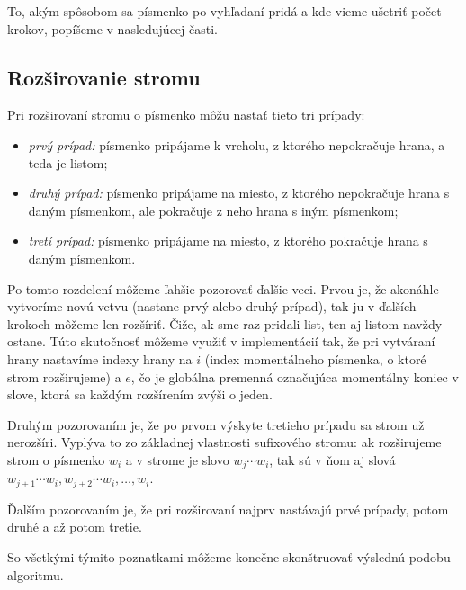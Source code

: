 To, akým spôsobom sa písmenko po vyhľadaní pridá a kde vieme ušetriť počet 
krokov, popíšeme v nasledujúcej časti.

\subsection{Rozširovanie stromu}

Pri rozširovaní stromu o písmenko môžu nastať tieto tri prípady:
\begin{itemize}
\item \emph{prvý prípad:} písmenko pripájame k vrcholu, z ktorého nepokračuje 
hrana, a teda je listom;
\item \emph{druhý prípad:} písmenko pripájame na miesto, z ktorého nepokračuje 
hrana s daným písmenkom, ale pokračuje z neho hrana s iným písmenkom;
\item \emph{tretí prípad:} písmenko pripájame na miesto, z ktorého pokračuje 
hrana s daným písmenkom.
\end{itemize}

Po tomto rozdelení môžeme ľahšie pozorovať ďalšie veci. Prvou je, že akonáhle 
vytvoríme novú vetvu (nastane prvý alebo druhý prípad), tak ju v ďalších 
krokoch môžeme len rozšíriť. Čiže, ak sme raz pridali list, ten aj listom 
navždy ostane. Túto skutočnosť môžeme využiť v implementácií tak, že pri 
vytváraní hrany 
nastavíme indexy hrany na $i$ (index momentálneho písmenka, o ktoré strom 
rozširujeme) a $e$, čo je globálna premenná označujúca momentálny koniec v 
slove, ktorá sa každým rozšírením zvýši o jeden.

Druhým pozorovaním je, že po prvom výskyte tretieho prípadu sa strom už 
nerozšíri. Vyplýva to zo základnej vlastnosti sufixového stromu: ak 
rozširujeme strom o písmenko $w_i$ a v strome je slovo $w_j\cdots w_i$, tak 
sú v ňom aj slová $w_{j+1}\cdots w_i, w_{j+2}\cdots w_i, \ldots, w_i$.

Ďalším pozorovaním je, že pri rozširovaní najprv nastávajú prvé prípady, 
potom druhé a až potom tretie.

So všetkými týmito poznatkami môžeme konečne skonštruovať výslednú podobu 
algoritmu.

